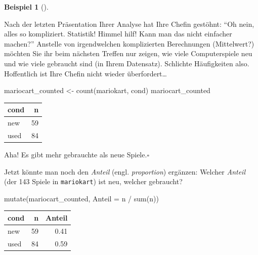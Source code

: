 \documentclass[
  a4paper,
]{scrbook}
\newenvironment{Shaded}{\begin{snugshade}}{\end{snugshade}}
\newcommand{\AttributeTok}[1]{\textcolor[rgb]{0.40,0.45,0.13}{#1}}
\newcommand{\FunctionTok}[1]{\textcolor[rgb]{0.28,0.35,0.67}{#1}}
\newcommand{\NormalTok}[1]{\textcolor[rgb]{0.00,0.23,0.31}{#1}}
\newcommand{\OtherTok}[1]{\textcolor[rgb]{0.00,0.23,0.31}{#1}}
\newcommand{\SpecialCharTok}[1]{\textcolor[rgb]{0.37,0.37,0.37}{#1}}
\theoremstyle{definition}
\newtheorem{example}{Beispiel}[chapter]
\theoremstyle{definition}
\theoremstyle{definition}
\theoremstyle{remark}
\begin{document}
\begin{example}[]\protect\hypertarget{exm-count}{}\label{exm-count}

Nach der letzten Präsentation Ihrer Analyse hat Ihre Chefin gestöhnt:
``Oh nein, alles so kompliziert. Statistik! Himmel hilf! Kann man das
nicht einfacher machen?'' Anstelle von irgendwelchen komplizierten
Berechnungen (Mittelwert?) möchten Sie ihr beim nächsten Treffen nur
zeigen, wie viele Computerspiele neu und wie viele gebraucht sind (in
Ihrem Datensatz). Schlichte Häufigkeiten also. Hoffentlich ist Ihre
Chefin nicht wieder überfordert\ldots{}

\begin{Shaded}
\begin{Highlighting}[]
\NormalTok{mariocart\_counted }\OtherTok{\textless{}{-}} \FunctionTok{count}\NormalTok{(mariokart, cond)}
\NormalTok{mariocart\_counted}
\end{Highlighting}
\end{Shaded}

\begin{longtable}[]{@{}lr@{}}
\toprule\noalign{}
cond & n \\
\midrule\noalign{}
\endhead
\bottomrule\noalign{}
\endlastfoot
new & 59 \\
used & 84 \\
\end{longtable}

Aha! Es gibt mehr gebrauchte als neue Spiele.\(\square\)

\end{example}

Jetzt könnte man noch den \emph{Anteil} (engl. \emph{proportion})
ergänzen: Welcher \emph{Anteil} (der 143 Spiele in \texttt{mariokart})
ist neu, welcher gebraucht?

\begin{Shaded}
\begin{Highlighting}[]
\FunctionTok{mutate}\NormalTok{(mariocart\_counted, }\AttributeTok{Anteil =}\NormalTok{ n }\SpecialCharTok{/} \FunctionTok{sum}\NormalTok{(n))}
\end{Highlighting}
\end{Shaded}

\begin{longtable}[]{@{}lrr@{}}
\toprule\noalign{}
cond & n & Anteil \\
\midrule\noalign{}
\endhead
\bottomrule\noalign{}
\endlastfoot
new & 59 & 0.41 \\
used & 84 & 0.59 \\
\end{longtable}
\end{document}
